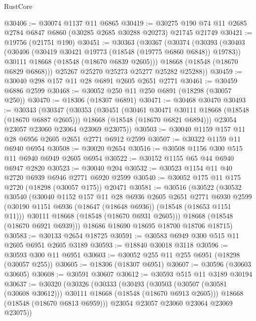 \begin{lexlean}{RustCore}
\begin{coremodule}
@30406 := @30074 @1137 @11 @6865
@30419 := @30275 @190 @74 @11 @2685 @2784 @6847 @6860 (@30285 @2685 @30288 @20273) @21745 @21749
@30421 := @19756 (@21751 @190)
@30451 := @30363
    (@30367
      (@30374
        (@30393
          (@30403
            (@30406 (@30419 @30421 @19773 (@18548 (@19775 @6860 @6848)) @19783))
            @30111
            @18668
            (@18548 (@18670 @6839 @2605)))
          @18668
          (@18548 (@18670 @6829 @6868)))
        @25267
        @25270
        @25273
        @25277
        @25282
        @25288))
@30459 := @30040 @298 @157 @11 @28 @6891 @2605 @2651 @2771
@30461 := @30459 @6886 @2599
@30468 := @30052 @250 @11 @250 @6891 (@18298 (@30057 @250))
@30470 := @18306 (@18307 @6891)
@30471 := @30468 @30470
@30493 := @30343
    (@30347
      (@30353
        (@30451
          (@30461 @30471 @30111 @18668 (@18548 (@18670 @6887 @2605)))
          @18668
          (@18548 (@18670 @6821 @6894)))
        @23054
        @23057
        @23060
        @23064
        @23069
        @23075))
@30503 := @30040 @1159 @157 @11 @28 @6956 @2605 @2651 @2771 @6912 @2599
@30507 := @30322 @1159 @11 @6940 @6954
@30508 := @30020 @2654
@30516 := @30508 @1156 @300 @515 @11 @6940 @6949 @2605 @6954
@30522 := @30152 @1155 @65 @44 @6940 @6947 @2820
@30523 := @30040 @204
@30532 := @30523 @1154 @11 @40 @2720 @6939 @6946 @2771 @6920 @2599
@30540 := @30052 @175 @11 @175 @2720 (@18298 (@30057 @175)) @20471
@30581 := @30516
    (@30522
      (@30532
        @30540
        (@30040
          @1152
          @157
          @11
          @28
          @6936
          @2605
          @2651
          @2771
          @6930
          @2599
          (@30190 @1151 @6936 (@18647 (@18648 @6936)) (@18548 (@18653 @1151 @11)))
          @30111
          @18668
          (@18548 (@18670 @6931 @2605)))
        @18668
        (@18548 (@18670 @6921 @6939)))
      @18686
      @18690
      @18695
      @18700
      @18706
      @18715)
@30583 := @30133 @2654 @18725
@30591 := @30583 @6949 @300 @515 @11 @2605 @6951 @2605 @3189
@30593 := @18840 @30018 @3118
@30596 := @30593 @300 @11 @6951
@30603 := @30052 @255 @11 @255 @6951 (@18298 (@30057 @255))
@30605 := @18306 (@18307 @6951)
@30607 := @30596 (@30603 @30605)
@30608 := @30591 @30607
@30612 := @30593 @515 @11 @3189 @30194
@30637 := @30320
    (@30326
      (@30333
        (@30493
          (@30503 (@30507 (@30581 (@30608 @30612))) @30111 @18668 (@18548 (@18670 @6913 @2605)))
          @18668
          (@18548 (@18670 @6813 @6959)))
        @23054
        @23057
        @23060
        @23064
        @23069
        @23075))

\end{coremodule}
\end{lexlean}
